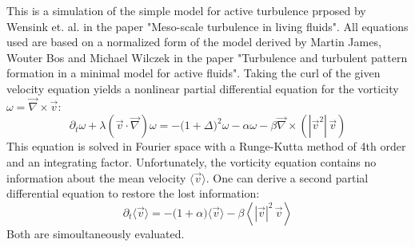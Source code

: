 \documentclass{article}
\begin{document}
This is a simulation of the simple model for active turbulence prposed by Wensink et. al. in the paper "Meso-scale turbulence in living fluids". All equations used are based on a normalized form of the model derived by Martin James, Wouter Bos and Michael Wilczek in the paper "Turbulence and turbulent pattern formation in a minimal model for active fluids".
Taking the curl of the given velocity equation yields a nonlinear partial differential equation for the vorticity $\omega=\vec\nabla\times\vec v$:
\begin{equation}
\partial_t\omega + \lambda\left(\vec v\cdot\vec\nabla\right)\omega = -\big(1+\Delta\big)^2\omega -\alpha\omega -\beta\vec\nabla\times\left(\left|\vec v^2\right|\,\vec v\right)
\end{equation}
This equation is solved in Fourier space with a Runge-Kutta method of 4th order and an integrating factor.
Unfortunately, the vorticity equation contains no information about the mean velocity $\langle\vec v\rangle$. One can derive a second partial differential equation to restore the lost information:
\begin{equation}
\partial_t\langle\vec v\rangle = -\big(1+\alpha\big)\langle\vec v\rangle -\beta\left\langle\left|\vec v\right|^2\,\vec v\right\rangle
\end{equation}
Both are simoultaneously evaluated.
\end{document}
